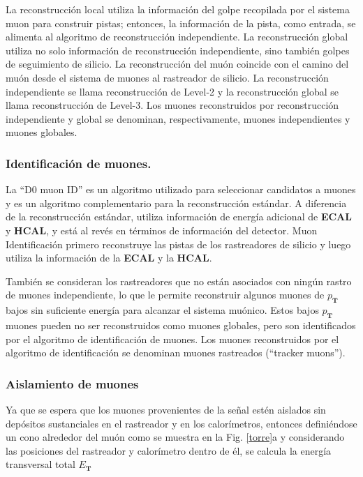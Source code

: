 La reconstrucción local utiliza la información del golpe recopilada por el sistema muon para construir pistas; entonces, la información de la pista, como entrada, se alimenta al algoritmo de reconstrucción independiente. La reconstrucción global utiliza no solo información de reconstrucción independiente, sino también golpes de seguimiento de silicio. La reconstrucción del muón coincide con el camino del muón desde el sistema de muones al rastreador de silicio. La reconstrucción independiente se llama reconstrucción de Level-2 y la reconstrucción global se llama reconstrucción de Level-3. Los muones reconstruidos por reconstrucción independiente y global se denominan, respectivamente, muones independientes y muones globales.



\subsubsection{Identificación de muones.}

La ``D0 muon ID'' es un algoritmo utilizado para seleccionar candidatos a muones y es un algoritmo complementario para la reconstrucción estándar. A diferencia de la reconstrucción estándar, utiliza información de energía adicional de \textbf{ECAL} y \textbf{HCAL}, y está al revés en términos de información del detector. Muon Identificación primero reconstruye las pistas de los rastreadores de silicio y luego utiliza la información de la \textbf{ECAL} y la \textbf{HCAL}.

También se consideran los rastreadores que no están asociados con ningún rastro de muones independiente, lo que le permite reconstruir algunos muones de $p_\mathbf{T}$ bajos sin suficiente energía para alcanzar el sistema muónico. Estos bajos $p_\mathbf{T}$ muones pueden no ser reconstruidos como muones globales, pero son identificados por el algoritmo de identificación de muones. Los muones reconstruidos por el algoritmo de identificación se denominan muones rastreados (``tracker muons'').

\subsubsection{Aislamiento de muones}


Ya que se espera que los muones provenientes de la señal estén aislados sin depósitos sustanciales en el rastreador y en los calorímetros, entonces definiéndose un cono alrededor del muón como se muestra en la Fig. \ref{torre}a y considerando las posiciones del rastreador y calorímetro dentro de él, se calcula la energía transversal total $E_\mathbf{T}$

